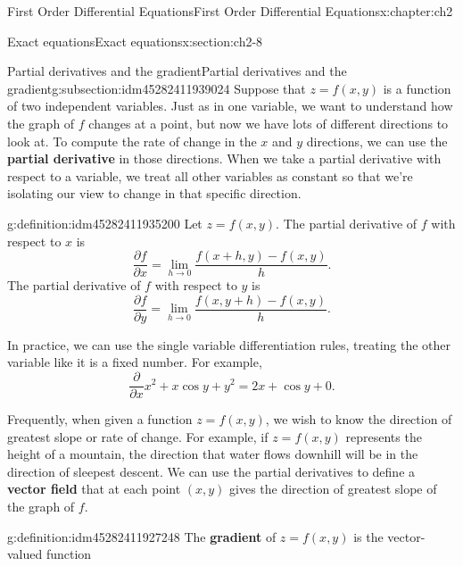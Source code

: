 \documentclass[oneside,10pt,]{book}
\newcommand{\terminology}[1]{\textbf{#1}}
\numberwithin{equation}{section}
\numberwithin{equation}{section}
\begin{document}
\begin{chapterptx}{First Order Differential Equations}{}{First Order Differential Equations}{}{}{x:chapter:ch2}
\begin{sectionptx}{Exact equations}{}{Exact equations}{}{}{x:section:ch2-8}
\begin{introduction}{}
\end{introduction}%
%
%
\typeout{************************************************}
\typeout{************************************************}
%
\begin{subsectionptx}{Partial derivatives and the gradient}{}{Partial derivatives and the gradient}{}{}{g:subsection:idm45282411939024}
Suppose that \(z = f(x,y)\) is a function of two independent variables. Just as in one variable, we want to understand how the graph of \(f\) changes at a point, but now we have lots of different directions to look at. To compute the rate of change in the \(x\) and \(y\) directions, we can use the \terminology{partial derivative} in those directions. When we take a partial derivative with respect to a variable, we treat all other variables as constant so that we're isolating our view to change in that specific direction.%
\begin{definition}{}{g:definition:idm45282411935200}%
Let \(z = f(x,y)\). The partial derivative of \(f\) with respect to \(x\) is%
\begin{equation*}
\frac{\partial f}{\partial x} = \lim_{h \to 0} \frac{f(x + h, y) - f(x,y)}{h}.
\end{equation*}
The partial derivative of \(f\) with respect to \(y\) is%
\begin{equation*}
\frac{\partial f}{\partial y} = \lim_{h\to 0}\frac{f(x, y+h) - f(x,y)}{h}.
\end{equation*}
%
\end{definition}
In practice, we can use the single variable differentiation rules, treating the other variable like it is a fixed number. For example,%
\begin{equation*}
\frac{\partial}{\partial x} x^2 + x \cos y + y^2 = 2x + \cos y + 0.
\end{equation*}
%
\par
Frequently, when given a function \(z = f(x,y)\), we wish to know the direction of greatest slope or rate of change. For example, if \(z = f(x,y)\) represents the height of a mountain, the direction that water flows downhill will be in the direction of sleepest descent. We can use the partial derivatives to define a \terminology{vector field} that at each point \((x,y)\) gives the direction of greatest slope of the graph of \(f\).%
\begin{definition}{}{g:definition:idm45282411927248}%
The \terminology{gradient} of \(z = f(x,y)\) is the vector-valued function%
\begin{equation*}

\end{equation*}
\end{definition}
\end{subsectionptx}
\end{sectionptx}
\end{chapterptx}
\end{document}
